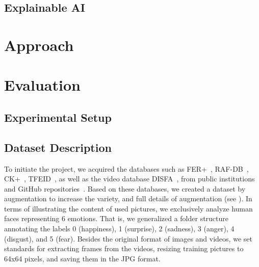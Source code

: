 \subsection{Explainable AI}
\label{sec:related:ai}

\section{Approach}
\label{sec:approach}

\section{Evaluation}
\label{sec:evaluation}

\subsection{Experimental Setup}
\label{sec:evaluation:setup}


\subsection{Dataset Description}
\label{sec:evaluation:datasets}

To initiate the project, %
we acquired the databases such as FER+~\cite{BarsoumZCZ16}, 
RAF-DB~\cite{li_reliable_2017,li2019reliable}, CK+~\cite{LuceyCKSAM10}, 
TFEID~\cite{tfeid,LiGL22}, 
as well as the video database DISFA~\cite{MavadatiMBTC13}, 
from public institutions and GitHub repositories~\cite{cs229_2023}. 
Based on these databases, we created a dataset by augmentation to increase the variety, 
and full details of augmentation (see ). 
In terms of illustrating the content of used pictures, we exclusively analyze human faces representing 6 emotions. 
That is, 
we generalized a folder structure annotating the labels 0 (happiness), 1 (surprise), 2 (sadness), 3 (anger), 4 (disgust), and 5 (fear). 
Besides the original format of images and videos, we set standards for extracting frames from the videos, 
resizing training pictures to 64x64 pixels, and saving them in the JPG format.

